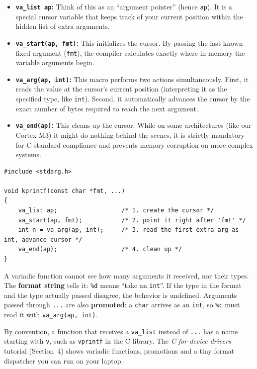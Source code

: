 \begin{itemize}
    \item \textbf{\texttt{va\_list ap}:} Think of this as an ``argument pointer'' (hence \texttt{ap}). It is a special cursor variable that keeps track of your current position within the hidden list of extra arguments.
    \item \textbf{\texttt{va\_start(ap, fmt)}:} This initializes the cursor. By passing the last known fixed argument (\texttt{fmt}), the compiler calculates exactly where in memory the variable arguments begin.
    \item \textbf{\texttt{va\_arg(ap, int)}:} This macro performs two actions simultaneously. First, it reads the value at the cursor's current position (interpreting it as the specified type, like \texttt{int}). Second, it automatically advances the cursor by the exact number of bytes required to reach the next argument.
    \item \textbf{\texttt{va\_end(ap)}:} This cleans up the cursor. While on some architectures (like our Cortex-M3) it might do nothing behind the scenes, it is strictly mandatory for C standard compliance and prevents memory corruption on more complex systems.
\end{itemize}

\begin{lstlisting}
#include <stdarg.h>

void kprintf(const char *fmt, ...)
{
    va_list ap;                  /* 1. create the cursor */
    va_start(ap, fmt);           /* 2. point it right after 'fmt' */
    int n = va_arg(ap, int);     /* 3. read the first extra arg as int, advance cursor */
    va_end(ap);                  /* 4. clean up */
}
\end{lstlisting}

A variadic function cannot see how many arguments it received, nor their types.
The \textbf{format string} tells it: \texttt{\%d} means ``take an \texttt{int}''.
If the type in the format and the type actually passed disagree, the behavior is
undefined. Arguments passed through \texttt{...} are also \textbf{promoted}: a
\texttt{char} arrives as an \texttt{int}, so \texttt{\%c} must read it with
\texttt{va\_arg(ap, int)}.

By convention, a function that receives a \texttt{va\_list} instead of \texttt{...} has a name starting with \texttt{v}, such as \texttt{vprintf} in the C library. The \emph{C for device drivers} tutorial (Section~4) shows variadic functions, promotions and a tiny format dispatcher you can run on your laptop.

